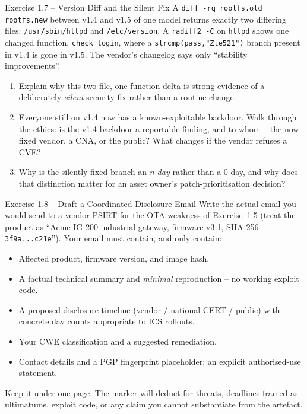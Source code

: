 \documentclass[11pt,a4paper]{article}
\begin{document}
\begin{taskbox}{Exercise 1.7 -- Version Diff and the Silent Fix}
A \texttt{diff -rq rootfs.old rootfs.new} between v1.4 and v1.5 of one model returns exactly two
differing files: \texttt{/usr/sbin/httpd} and \texttt{/etc/version}. A \texttt{radiff2 -C} on
\texttt{httpd} shows one changed function, \texttt{check\_login}, where a
\texttt{strcmp(pass,"Zte521")} branch present in v1.4 is gone in v1.5. The vendor's changelog
says only ``stability improvements''.
\begin{enumerate}\setlength{\itemsep}{0pt}
  \item Explain why this two-file, one-function delta is strong evidence of a deliberately
        \emph{silent} security fix rather than a routine change.
  \item Everyone still on v1.4 now has a known-exploitable backdoor. Walk through the ethics:
        is the v1.4 backdoor a reportable finding, and to whom -- the now-fixed vendor, a CNA,
        or the public? What changes if the vendor refuses a CVE?
  \item Why is the silently-fixed branch an \emph{n-day} rather than a 0-day, and why does that
        distinction matter for an asset owner's patch-prioritisation decision?
\end{enumerate}
\end{taskbox}

\begin{taskbox}{Exercise 1.8 -- Draft a Coordinated-Disclosure Email}
Write the actual email you would send to a vendor PSIRT for the OTA weakness of Exercise~1.5
(treat the product as ``Acme IG-200 industrial gateway, firmware v3.1,
SHA-256 \texttt{3f9a...c21e}''). Your email must contain, and only contain:
\begin{itemize}\setlength{\itemsep}{0pt}
  \item Affected product, firmware version, and image hash.
  \item A factual technical summary and \emph{minimal} reproduction -- no working exploit code.
  \item A proposed disclosure timeline (vendor / national CERT / public) with concrete day
        counts appropriate to ICS rollouts.
  \item Your CWE classification and a suggested remediation.
  \item Contact details and a PGP fingerprint placeholder; an explicit authorised-use statement.
\end{itemize}
Keep it under one page. The marker will deduct for threats, deadlines framed as ultimatums,
exploit code, or any claim you cannot substantiate from the artefact.
\end{taskbox}
\end{document}
